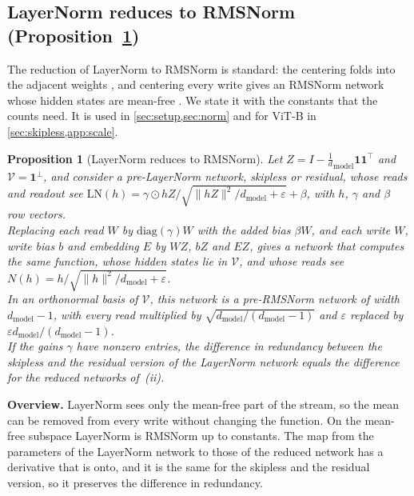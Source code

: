 \documentclass[10pt]{article}
\newtheorem{proposition}[theorem]{Proposition}
\theoremstyle{definition}
\theoremstyle{remark}
\newcommand{\dm}{d_{\mathrm{model}}}
\newcommand{\norm}[1]{\lVert #1\rVert}
\newcommand{\para}[1]{\smallskip\noindent\textbf{#1}\hspace{0.5em}}
\newcommand{\ptlabel}[1]{\phantomsection\label{#1}}
\newcommand{\stpart}[3]{\ifx\relax#1\relax\else\ptlabel{#1:#2}\fi{\upshape\bfseries\boldmath(#2)\ifx\relax#3\relax\else\ #3.\fi}}
\begin{document}
\subsection{LayerNorm reduces to RMSNorm\texorpdfstring{ (Proposition~\ref*{prop:ln})}{}}\label{app:ln}

The reduction of LayerNorm to RMSNorm is standard: the centering folds into the adjacent weights \citep{elhage2021circuits}, and centering every write gives an RMSNorm network whose hidden states are mean-free \citep{ashkboos2024slicegpt,theus2025glmc}. We state it with the constants that the counts need. It is used in \cref{sec:setup,sec:norm} and for ViT-B in \cref{sec:skipless,app:scale}.

\begin{proposition}[LayerNorm reduces to RMSNorm]\label{prop:ln}
Let $Z = I - \tfrac1\dm\mathbf 1\mathbf 1^\top$ and $\mathcal V = \mathbf 1^\perp$, and consider a pre-LayerNorm network, skipless or residual, whose reads and readout see $\mathrm{LN}(h) = \gamma\odot hZ/\sqrt{\norm{hZ}^2/\dm + \varepsilon} + \beta$, with $h$, $\gamma$ and $\beta$ row vectors.\\
\stpart{}{i}{} Replacing each read $W$ by $\mathrm{diag}(\gamma)W$ with the added bias $\beta W$, and each write $W$, write bias $b$ and embedding $E$ by $WZ$, $bZ$ and $EZ$, gives a network that computes the same function, whose hidden states lie in $\mathcal V$, and whose reads see $N(h) = h/\sqrt{\norm{h}^2/\dm + \varepsilon}$.\\
\stpart{}{ii}{} In an orthonormal basis of $\mathcal V$, this network is a pre-RMSNorm network of width $\dm-1$, with every read multiplied by $\sqrt{\dm/(\dm-1)}$ and $\varepsilon$ replaced by $\varepsilon \dm/(\dm-1)$.\\
\stpart{}{iii}{} If the gains $\gamma$ have nonzero entries, the difference in redundancy between the skipless and the residual version of the LayerNorm network equals the difference for the reduced networks of~(ii).
\end{proposition}

\para{Overview.} LayerNorm sees only the mean-free part of the stream, so the mean can be removed from every write without changing the function. On the mean-free subspace LayerNorm is RMSNorm up to constants. The map from the parameters of the LayerNorm network to those of the reduced network has a derivative that is onto, and it is the same for the skipless and the residual version, so it preserves the difference in redundancy.
\end{document}
